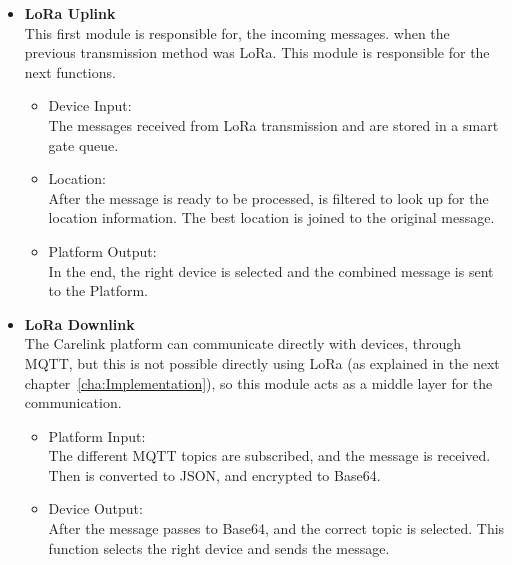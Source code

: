 \begin{itemize}
\label{susec:Lora_to_Platform}
   \item \textbf{LoRa Uplink} \\
   This first module is responsible for, the incoming messages. when the previous transmission method was LoRa. This module is responsible for the  next functions.
   \begin{itemize}
     \item Device Input: \\
      The messages received from LoRa transmission and are stored in a smart gate  queue.
   \end{itemize}
   \begin{itemize}
     \item Location: \\
      After the message is ready to be processed, is filtered to look up for the location information. The best location is joined to the original message.
   \end{itemize}
   \begin{itemize}
     \item Platform Output: \\
      In the end, the right device is selected and  the combined message is sent to the Platform.
   \end{itemize}
\end{itemize}


\begin{itemize}
   \item \textbf{LoRa Downlink} \\
   The Carelink platform can communicate directly with devices, through MQTT, but this is not possible directly using LoRa (as explained in the next chapter~\ref{cha:Implementation}), so this module acts as a middle layer for the communication. 
   \begin{itemize}
     \item Platform Input:\\ 
     The different MQTT topics are subscribed, and the message is received. Then is converted to JSON, and encrypted to Base64.
   \end{itemize}
   \begin{itemize}
     \item Device Output: \\
     After the message passes to Base64, and the correct topic is selected. This function selects the right device and sends the message.
   \end{itemize}
\end{itemize}


